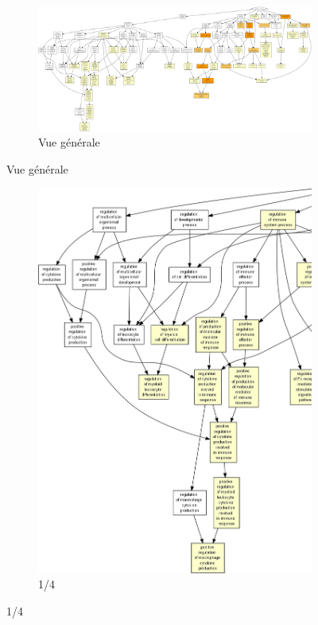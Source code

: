 \begin{figure}
\begin{subfigure}{\textwidth}
\includegraphics[width=\textwidth]
{Figures/hlc-go-pot-down/hlc-go-pot-down.png}
\caption{Vue générale}
\end{subfigure}
\end{figure}

\begin{figure}[p]
\ContinuedFloat
\begin{subfigure}{\textwidth}
\includegraphics[width=\textwidth]
{Figures/hlc-go-pot-down/hlc-go-pot-down_0.png}
\caption{1/4}
\end{subfigure}
\end{figure}

